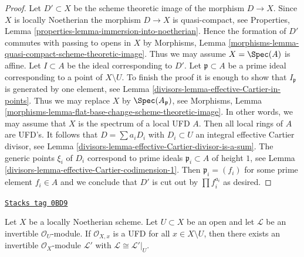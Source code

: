 \begin{proof}

Let $D' \subset X$ be the scheme theoretic image of the morphism $D \to X$.
Since $X$ is locally Noetherian the morphism $D \to X$ is quasi-compact, see
Properties, Lemma \ref{properties-lemma-immersion-into-noetherian}.
Hence the formation of $D'$ commutes with passing to opens in $X$ by
Morphisms, Lemma \ref{morphisms-lemma-quasi-compact-scheme-theoretic-image}.
Thus we may assume $X = \Spec(A)$ is affine.
Let $I \subset A$ be the ideal corresponding to $D'$.
Let $\mathfrak p \subset A$ be a prime ideal corresponding to a point
of $X \setminus U$.
To finish the proof it is enough to show that $I_\mathfrak p$ is generated
by one element, see Lemma \ref{divisors-lemma-effective-Cartier-in-points}.
Thus we may replace $X$ by $\Spec(A_\mathfrak p)$, see
Morphisms, Lemma \ref{morphisms-lemma-flat-base-change-scheme-theoretic-image}.
In other words, we may assume that $X$ is the spectrum of a local
UFD $A$. Then all local rings of $A$ are UFD's. It follows that
$D = \sum a_i D_i$ with $D_i \subset U$ an integral effective Cartier divisor,
see Lemma \ref{divisors-lemma-effective-Cartier-divisor-is-a-sum}.
The generic points $\xi_i$ of $D_i$ correspond to prime ideals
$\mathfrak p_i \subset A$ of height $1$, see
Lemma \ref{divisors-lemma-effective-Cartier-codimension-1}.
Then $\mathfrak p_i = (f_i)$ for some prime element $f_i \in A$
and we conclude that $D'$ is cut out by $\prod f_i^{a_i}$ as desired.
\end{proof}

\begin{lemma}
\label{divisors-lemma-extend-invertible-module}
\href{https://stacks.math.columbia.edu/tag/0BD9}{\texttt{Stacks tag 0BD9}}

Let $X$ be a locally Noetherian scheme. Let $U \subset X$ be
an open and let $\mathcal{L}$ be an invertible $\mathcal{O}_U$-module.
If $\mathcal{O}_{X, x}$ is a UFD for all $x \in X \setminus U$,
then there exists an invertible $\mathcal{O}_X$-module $\mathcal{L}'$
with $\mathcal{L} \cong \mathcal{L}'|_U$.
\end{lemma}

